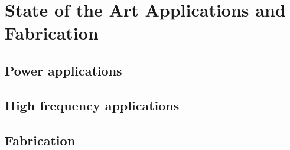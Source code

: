 \section{State of the Art Applications and Fabrication}
\subsection{Power applications}
\subsection{High frequency applications}
\subsection{Fabrication}